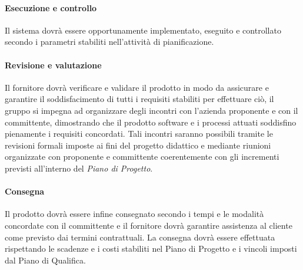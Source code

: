 \paragraph{Esecuzione e controllo}
Il sistema dovrà essere opportunamente implementato, eseguito e controllato secondo i parametri stabiliti nell'attività di pianificazione.

\paragraph{Revisione e valutazione}
Il fornitore dovrà verificare e validare il prodotto in modo da assicurare e garantire il soddisfacimento di tutti i requisiti stabiliti per effettuare ciò, il gruppo si impegna ad organizzare degli incontri con l'azienda proponente e con il committente, dimostrando che il prodotto software e i processi attuati soddisfino pienamente i requisiti concordati. Tali incontri saranno possibili tramite le revisioni formali imposte ai fini del progetto didattico e mediante riunioni organizzate con proponente e committente coerentemente con gli incrementi previsti all'interno del \textit{Piano di Progetto}\docs.

\paragraph{Consegna}
Il prodotto dovrà essere infine consegnato secondo i tempi e le modalità concordate con il committente e il fornitore dovrà garantire assistenza al cliente come previsto dai termini contrattuali. La consegna dovrà essere effettuata rispettando le scadenze e i costi stabiliti nel Piano di Progetto e i vincoli imposti dal Piano di Qualifica.


